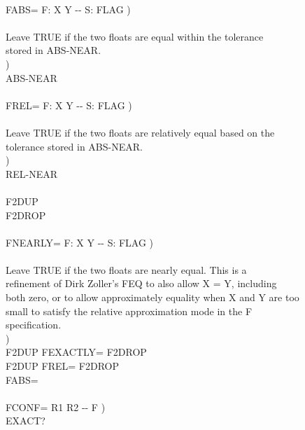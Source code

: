 \begin{tt}
\\
\tab \word{:} FABS=   F: X Y -{}- S: FLAG ) \\
\tab[2]  \\
\tab[2] Leave TRUE if the two floats are equal within the tolerance \\
\tab[2] stored in ABS-NEAR. \\
\tab[2] ) \\
\tab[2] ABS-NEAR   \word{;} \\
\\
\tab \word{:} FREL=   F: X Y -{}- S: FLAG ) \\
\tab[2]  \\
\tab[2] Leave TRUE if the two floats are relatively equal based on the \\
\tab[2] tolerance stored in ABS-NEAR. \\
\tab[2] ) \\
\tab[2] REL-NEAR    \word{;} \\
\\
\tab \word{:} F2DUP    \word{;} \\
\tab \word{:} F2DROP   \word{;} \\
\\
\tab \word{:} FNEARLY=   F: X Y -{}- S: FLAG ) \\
\tab[2]  \\
\tab[2] Leave TRUE if the two floats are nearly equal.  This is a  \\
\tab[2] refinement of Dirk Zoller's FEQ to also allow X = Y, including \\
\tab[2] both zero, or to allow approximately equality when X and Y are too \\
\tab[2] small to satisfy the relative approximation mode in the F\texttildelow \\
\tab[2] specification. \\
\tab[2] ) \\
\tab[2] F2DUP FEXACTLY=  F2DROP    \\
\tab[2] F2DUP FREL=      F2DROP    \\
\tab[2] FABS= \word{;} \\
\\
\tab \word{:} FCONF=  R1 R2 -{}- F ) \\
\tab[2] EXACT?  \\

\end{tt}
